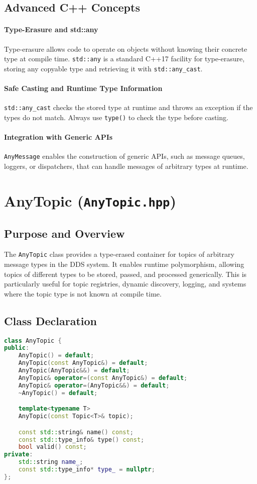 \documentclass[12pt]{report}
\begin{document}
\subsection{Advanced C++ Concepts}
\paragraph{Type-Erasure and std::any}
Type-erasure allows code to operate on objects without knowing their concrete type at compile time. \texttt{std::any} is a standard C++17 facility for type-erasure, storing any copyable type and retrieving it with \texttt{std::any\_cast}.

\paragraph{Safe Casting and Runtime Type Information}
\texttt{std::any\_cast} checks the stored type at runtime and throws an exception if the types do not match. Always use \texttt{type()} to check the type before casting.

\paragraph{Integration with Generic APIs}
\texttt{AnyMessage} enables the construction of generic APIs, such as message queues, loggers, or dispatchers, that can handle messages of arbitrary types at runtime.

\section{AnyTopic (\texttt{AnyTopic.hpp})}

\subsection{Purpose and Overview}
The \texttt{AnyTopic} class provides a type-erased container for topics of arbitrary message types in the DDS system. It enables runtime polymorphism, allowing topics of different types to be stored, passed, and processed generically. This is particularly useful for topic registries, dynamic discovery, logging, and systems where the topic type is not known at compile time.

\subsection{Class Declaration}
\begin{lstlisting}[language=C++]
class AnyTopic {
public:
    AnyTopic() = default;
    AnyTopic(const AnyTopic&) = default;
    AnyTopic(AnyTopic&&) = default;
    AnyTopic& operator=(const AnyTopic&) = default;
    AnyTopic& operator=(AnyTopic&&) = default;
    ~AnyTopic() = default;

    template<typename T>
    AnyTopic(const Topic<T>& topic);

    const std::string& name() const;
    const std::type_info& type() const;
    bool valid() const;
private:
    std::string name_;
    const std::type_info* type_ = nullptr;
};
\end{lstlisting}
\end{document}
